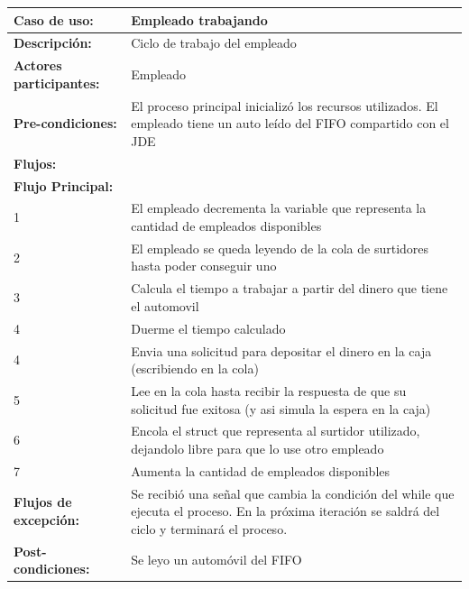 \documentclass[12pt,a4paper,spanish]{article}
\begin{document}
	\begin{tabular}{|p{4cm}|p{12cm}|}
    \hline
    \textbf{Caso de uso:} & Empleado trabajando \\
    \hline
    \textbf{Descripción:} &  Ciclo de trabajo del empleado\\
    \hline
    \textbf{Actores participantes:} & Empleado\\
    \hline
 
    \textbf{Pre-condiciones:} &  El proceso principal inicializó los recursos utilizados. El empleado tiene un auto leído del FIFO compartido con el JDE\\
    \hline
    \hline
    \textbf{Flujos:} &\\
    \hline
	\textbf{Flujo Principal:} &\\ 

	\hline
	1 & El empleado decrementa la variable que representa la cantidad de empleados disponibles\\
	\hline
	2 & El empleado se queda leyendo de la cola de surtidores hasta poder conseguir uno\\
	\hline
	3 & Calcula el tiempo a trabajar a partir del dinero que tiene el automovil\\
	\hline
	4 & Duerme el tiempo calculado\\
	\hline
	4 & Envia una solicitud para depositar el dinero en la caja (escribiendo en la cola) \\
	\hline
	5 & Lee en la cola hasta recibir la respuesta de que su solicitud fue exitosa (y asi simula la espera en la caja)\\
	\hline
	6 & Encola el struct que representa al surtidor utilizado, dejandolo libre para que lo use otro empleado\\
	\hline
	7 & Aumenta la cantidad de empleados disponibles\\
	\hline
	\hline
	\textbf{Flujos de excepción:} & Se recibió una señal que cambia la condición del while que ejecuta el proceso. En la próxima iteración se saldrá del ciclo y terminará el proceso.\\
    \hline

    \hline
	\textbf{Post-condiciones:} & Se leyo un automóvil del FIFO\\
	\hline
	\end{tabular}

	\newpage
\end{document}

